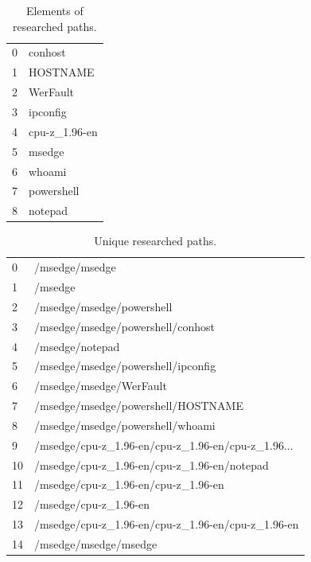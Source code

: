 \documentclass[a4paper,twoside,12pt]{book}
\begin{document}
\begin{table}
\centering
\caption{Elements of researched paths.}
\label{id:tab:pathElems}
\begin{tabular}{ll}
	\toprule
	0 &        conhost \\
	1 &       HOSTNAME \\
	2 &       WerFault \\
	3 &       ipconfig \\
	4 &  cpu-z\_1.96-en \\
	5 &         msedge \\
	6 &         whoami \\
	7 &     powershell \\
	8 &        notepad \\
	\bottomrule
\end{tabular}
\end{table}		
	
\begin{table}
	\centering
	\caption{Unique researched paths.}
	\label{id:tab:uniqPaths}
	\begin{tabular}{ll}
		\toprule
		0  &                                     /msedge/msedge \\
		1  &                                            /msedge \\
		2  &                          /msedge/msedge/powershell \\
		3  &                  /msedge/msedge/powershell/conhost \\
		4  &                                    /msedge/notepad \\
		5  &                 /msedge/msedge/powershell/ipconfig \\
		6  &                            /msedge/msedge/WerFault \\
		7  &                 /msedge/msedge/powershell/HOSTNAME \\
		8  &                   /msedge/msedge/powershell/whoami \\
		9  &  /msedge/cpu-z\_1.96-en/cpu-z\_1.96-en/cpu-z\_1.96... \\
		10 &        /msedge/cpu-z\_1.96-en/cpu-z\_1.96-en/notepad \\
		11 &                /msedge/cpu-z\_1.96-en/cpu-z\_1.96-en \\
		12 &                              /msedge/cpu-z\_1.96-en \\
		13 &  /msedge/cpu-z\_1.96-en/cpu-z\_1.96-en/cpu-z\_1.96-en \\
		14 &                              /msedge/msedge/msedge \\
		\bottomrule
	\end{tabular}
\end{table}
\end{document}
